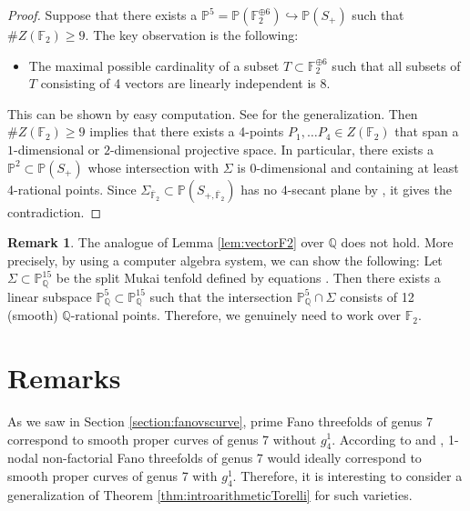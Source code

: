 \documentclass[autodetect-engine, a4paper]{amsart}
\theoremstyle{definition}
\newtheorem{rem}[thm]{Remark}
\def\F{{\mathbb F}}
\def\P{{\mathbb P}}
\def\Q{{\mathbb Q}}
\newcommand{\cred}{\color{black}}
\begin{document}
\begin{proof}

Suppose that there exists a $\P^5 = \P (\F_{2}^{\oplus 6}) \hookrightarrow \P (S_{+})$ such that $\# Z (\F_{2}) \geq 9$.
The key observation is the following:
\begin{itemize}
\item
The maximal possible cardinality of a subset $T \subset \F_{2}^{\oplus 6}$ such that all subsets of $T$ consisting of 4 vectors are linearly independent is $8$.
\end{itemize}
This can be shown by easy computation. See \cite[Theorem 2]{DMMS} for the generalization.
Then $\# Z(\F_{2}) \geq 9$ implies that there exists a 4-points $P_{1},\ldots P_{4} \in Z (\F_{2})$ that span a $1$-dimensional or $2$-dimensional projective space.
In particular, there exists a $\P^2 \subset \P(S_{+})$ whose intersection with $\Sigma$ is 0-dimensional and containing at least 4-rational points.
Since $\Sigma_{\overline{\F}_{2}} \subset \P(S_{+,\overline{\F}_{2}})$ has no $4$-secant plane by \cite[Proposition 1.16]{Mukaicurve}, it gives the contradiction.
\end{proof}

\begin{rem}
{\cred The analogue of Lemma \ref{lem:vectorF2} over $\Q$ does not hold. 
More precisely, by using a computer algebra system, we can show the following:
Let $\Sigma \subset \P^{15}_{\Q}$ be the split Mukai tenfold defined by equations \cite[(0.1)]{Mukaicurve}.
Then there exists a linear subspace $\P^{5}_{\Q} \subset \P^{15}_{\Q}$ such that the intersection $\P^{5}_{\Q} \cap \Sigma$ consists of 12 (smooth) $\Q$-rational points.
Therefore, we genuinely need to work over $\F_{2}$.}
\end{rem}


\section{Remarks}
\label{section:Remarks}

\medskip
{}
As we saw in Section \ref{section:fanovscurve}, prime Fano threefolds of genus 7 correspond to smooth proper curves of genus 7 without $g_4^1$.
According to \cite{Kuznetsov-Prokhorovnodal} and \cite[Section 8]{MukaiBrill}, 1-nodal non-factorial Fano threefolds of genus 7 would ideally correspond to smooth proper curves of genus 7 with $g_4^1$.
Therefore, it is interesting to consider a generalization of Theorem \ref{thm:introarithmeticTorelli} for such varieties.
\end{document}
